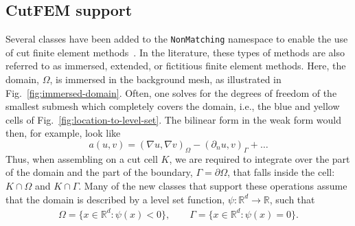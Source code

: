 \documentclass{ansarticle-preprint}
\begin{document}
\subsection{CutFEM support}\label{sec:cut}

Several classes have been added to the \texttt{NonMatching} namespace to enable the use of cut finite element methods~\cite{burman_cutfem_2015}.
In the literature, these types of methods are also referred to as immersed, extended, or fictitious finite element methods.
Here, the domain, $\Omega$, is immersed in the background mesh, as illustrated in Fig.~\ref{fig:immersed-domain}.
Often, one solves for the degrees of freedom of the smallest submesh
which completely covers the domain, i.e., the blue and yellow cells of
Fig.~\ref{fig:location-to-level-set}.
The bilinear form in the weak form would then, for example, look like
\begin{equation}
  a(u,v) = (\nabla u, \nabla v)_\Omega - (\partial_n u, v)_\Gamma + \ldots
\end{equation}
Thus, when assembling on a cut cell $K$, we are
required to integrate over the part of the domain and the part of the boundary, $\Gamma = \partial \Omega$, that falls inside the cell:
$K\cap \Omega$ and $K \cap \Gamma$.
Many of the new classes that support these operations assume that the domain is described by a level set function,
$\psi : \mathbb{R}^d \to \mathbb{R}$, such that
\begin{align}\label{eq:levelset}
  \Omega = \{x \in \mathbb{R}^d : \psi(x)<0\},
  \qquad
  \Gamma = \{x \in \mathbb{R}^d : \psi(x) = 0\}.
\end{align}
\end{document}
